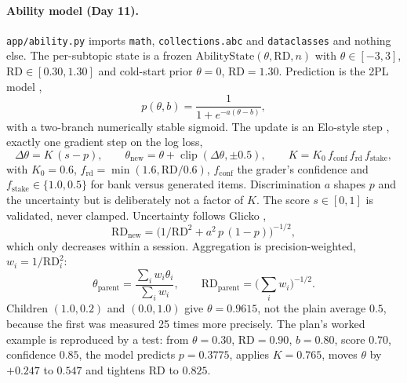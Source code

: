 \documentclass{tietreport}
\begin{document}
\paragraph{Ability model (Day 11).} \texttt{app/ability.py} imports \texttt{math},
\texttt{collections.abc} and \texttt{dataclasses} and nothing else. The per-subtopic state is a frozen
$\mathrm{AbilityState}(\theta,\mathrm{RD},n)$ with $\theta\in[-3,3]$, $\mathrm{RD}\in[0.30,1.30]$ and
cold-start prior $\theta=0$, $\mathrm{RD}=1.30$. Prediction is the 2PL model \cite{lord1980irt},
\begin{equation}
  p(\theta,b) = \frac{1}{1+e^{-a(\theta-b)}},
  \label{eq:2pl}
\end{equation}
with a two-branch numerically stable sigmoid. The update is an Elo-style step
\cite{elo1978rating}, exactly one gradient step on the log loss,
\begin{equation}
  \Delta\theta = K\,(s-p), \qquad \theta_{\text{new}} = \theta + \operatorname{clip}(\Delta\theta,\pm0.5),
  \qquad K = K_0\, f_{\text{conf}}\, f_{\text{rd}}\, f_{\text{stake}},
  \label{eq:update}
\end{equation}
with $K_0=0.6$, $f_{\text{rd}}=\min(1.6,\mathrm{RD}/0.6)$, $f_{\text{conf}}$ the grader's confidence
and $f_{\text{stake}}\in\{1.0,0.5\}$ for bank versus generated items. Discrimination $a$ shapes $p$
and the uncertainty but is deliberately not a factor of $K$. The score $s\in[0,1]$ is validated,
never clamped. Uncertainty follows Glicko \cite{glickman1999glicko},
\begin{equation}
  \mathrm{RD}_{\text{new}} = \big(1/\mathrm{RD}^2 + a^2\,p\,(1-p)\big)^{-1/2},
  \label{eq:rd}
\end{equation}
which only decreases within a session. Aggregation is precision-weighted, $w_i=1/\mathrm{RD}_i^2$:
\begin{equation}
  \theta_{\text{parent}} = \frac{\sum_i w_i\theta_i}{\sum_i w_i}, \qquad
  \mathrm{RD}_{\text{parent}} = \Big(\sum_i w_i\Big)^{-1/2}.
  \label{eq:rollup}
\end{equation}
Children $(1.0,0.2)$ and $(0.0,1.0)$ give $\theta=0.9615$, not the plain average $0.5$, because
the first was measured 25 times more precisely. The plan's worked example is reproduced by a
test: from $\theta=0.30$, $\mathrm{RD}=0.90$, $b=0.80$, score $0.70$, confidence $0.85$, the model
predicts $p=0.3775$, applies $K=0.765$, moves $\theta$ by $+0.247$ to $0.547$ and tightens RD to
$0.825$.
\end{document}
